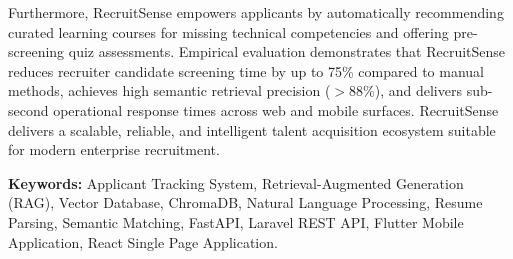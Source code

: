 Furthermore, RecruitSense empowers applicants by automatically recommending curated learning courses for missing technical competencies and offering pre-screening quiz assessments. Empirical evaluation demonstrates that RecruitSense reduces recruiter candidate screening time by up to 75\% compared to manual methods, achieves high semantic retrieval precision ($>88\%$), and delivers sub-second operational response times across web and mobile surfaces. RecruitSense delivers a scalable, reliable, and intelligent talent acquisition ecosystem suitable for modern enterprise recruitment.

\vspace{0.8cm}
\noindent \textbf{Keywords:} Applicant Tracking System, Retrieval-Augmented Generation (RAG), Vector Database, ChromaDB, Natural Language Processing, Resume Parsing, Semantic Matching, FastAPI, Laravel REST API, Flutter Mobile Application, React Single Page Application.